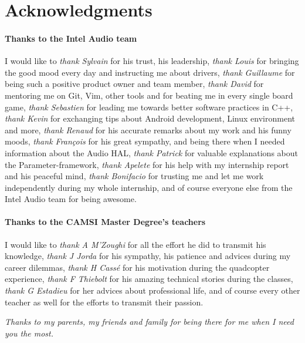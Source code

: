 \chapter*{Acknowledgments}

\subsubsection*{Thanks to the Intel Audio team}
I would like to
\emph{thank Sylvain} for his trust, his leadership,
\emph{thank Louis} for bringing the good mood every day and instructing me about drivers,
\emph{thank Guillaume} for being such a positive product owner and team member,
\emph{thank David} for mentoring me on Git, Vim, other tools and for beating me in every single board game,
\emph{thank Sebastien} for leading me towards better software practices in C++,
\emph{thank Kevin} for exchanging tips about Android development, Linux environment and more,
\emph{thank Renaud} for his accurate remarks about my work and his funny moods,
\emph{thank François} for his great sympathy, and being there when I needed information about the Audio HAL,
\emph{thank Patrick} for valuable explanations about the Parameter-framework,
\emph{thank Apelete} for his help with my internship report and his peaceful mind,
\emph{thank Bonifacio} for trusting me and let me work independently during my whole internship,
and of course everyone else from the Intel Audio team for being awesome.

\subsubsection*{Thanks to the CAMSI Master Degree's teachers}
I would like to
\emph{thank A M'Zoughi} for all the effort he did to transmit his knowledge,
\emph{thank J Jorda} for his sympathy, his patience and advices during my career dilemmas,
\emph{thank H Cassé} for his motivation during the quadcopter experience,
\emph{thank F Thiebolt} for his amazing technical stories during the classes,
\emph{thank G Estadieu} for her advices about professional life,
and of course every other teacher as well for the efforts to transmit their passion.

\vfill

\begin{minipage}{0.49\textwidth}
\begin{flushright}
\end{flushright}
\end{minipage}
\begin{minipage}{0.49\textwidth}
\begin{flushleft}
  \emph{Thanks to my parents, my friends and family for being there for me when I need you the most.}
\end{flushleft}
\end{minipage}
